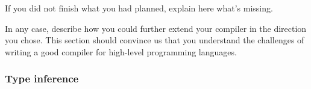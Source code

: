 If you did not finish what you had planned, explain here what's missing.

In any case, describe how you could further extend your compiler in the
direction you chose. This section should convince us that you understand the
challenges of writing a good compiler for high-level programming languages.
\subsubsection{Type inference}
